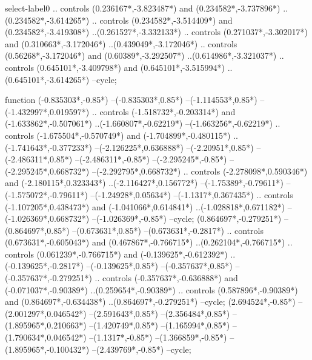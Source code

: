{\begin{scope}[x=1mm,y=1mm,line width=\SCstroke mm,line cap=round,line join=round]
\begin{SCpart}{select-label0}
.. controls ({0.236167*\SCF},{-3.823487*\SCF}) and ({0.234582*\SCF},{-3.737896*\SCF}) ..({0.234582*\SCF},{-3.614265*\SCF})
.. controls ({0.234582*\SCF},{-3.514409*\SCF}) and ({0.234582*\SCF},{-3.419308*\SCF}) ..({0.261527*\SCF},{-3.332133*\SCF})
.. controls ({0.271037*\SCF},{-3.302017*\SCF}) and ({0.310663*\SCF},{-3.172046*\SCF}) ..({0.439049*\SCF},{-3.172046*\SCF})
.. controls ({0.56268*\SCF},{-3.172046*\SCF}) and ({0.60389*\SCF},{-3.292507*\SCF}) ..({0.614986*\SCF},{-3.321037*\SCF})
.. controls ({0.645101*\SCF},{-3.409798*\SCF}) and ({0.645101*\SCF},{-3.515994*\SCF}) ..({0.645101*\SCF},{-3.614265*\SCF})
--cycle;
\end{SCpart}
\begin{SCpart}{function}
 ({-0.835303*\SCF},{-0.85*\SCF})
--({-0.835303*\SCF},{0.85*\SCF})
--({-1.114553*\SCF},{0.85*\SCF})
--({-1.432997*\SCF},{0.019597*\SCF})
.. controls ({-1.518732*\SCF},{-0.203314*\SCF}) and ({-1.633862*\SCF},{-0.507061*\SCF}) ..({-1.660807*\SCF},{-0.62219*\SCF})
--({-1.663256*\SCF},{-0.62219*\SCF})
.. controls ({-1.675504*\SCF},{-0.570749*\SCF}) and ({-1.704899*\SCF},{-0.480115*\SCF}) ..({-1.741643*\SCF},{-0.377233*\SCF})
--({-2.126225*\SCF},{0.636888*\SCF})
--({-2.20951*\SCF},{0.85*\SCF})
--({-2.486311*\SCF},{0.85*\SCF})
--({-2.486311*\SCF},{-0.85*\SCF})
--({-2.295245*\SCF},{-0.85*\SCF})
--({-2.295245*\SCF},{0.668732*\SCF})
--({-2.292795*\SCF},{0.668732*\SCF})
.. controls ({-2.278098*\SCF},{0.590346*\SCF}) and ({-2.180115*\SCF},{0.323343*\SCF}) ..({-2.116427*\SCF},{0.156772*\SCF})
--({-1.75389*\SCF},{-0.79611*\SCF})
--({-1.575072*\SCF},{-0.79611*\SCF})
--({-1.24928*\SCF},{0.05634*\SCF})
--({-1.1317*\SCF},{0.367435*\SCF})
.. controls ({-1.107205*\SCF},{0.438473*\SCF}) and ({-1.041066*\SCF},{0.614841*\SCF}) ..({-1.028818*\SCF},{0.671182*\SCF})
--({-1.026369*\SCF},{0.668732*\SCF})
--({-1.026369*\SCF},{-0.85*\SCF})
--cycle;
 ({0.864697*\SCF},{-0.279251*\SCF})
--({0.864697*\SCF},{0.85*\SCF})
--({0.673631*\SCF},{0.85*\SCF})
--({0.673631*\SCF},{-0.2817*\SCF})
.. controls ({0.673631*\SCF},{-0.605043*\SCF}) and ({0.467867*\SCF},{-0.766715*\SCF}) ..({0.262104*\SCF},{-0.766715*\SCF})
.. controls ({0.061239*\SCF},{-0.766715*\SCF}) and ({-0.139625*\SCF},{-0.612392*\SCF}) ..({-0.139625*\SCF},{-0.2817*\SCF})
--({-0.139625*\SCF},{0.85*\SCF})
--({-0.357637*\SCF},{0.85*\SCF})
--({-0.357637*\SCF},{-0.279251*\SCF})
.. controls ({-0.357637*\SCF},{-0.636888*\SCF}) and ({-0.071037*\SCF},{-0.90389*\SCF}) ..({0.259654*\SCF},{-0.90389*\SCF})
.. controls ({0.587896*\SCF},{-0.90389*\SCF}) and ({0.864697*\SCF},{-0.634438*\SCF}) ..({0.864697*\SCF},{-0.279251*\SCF})
--cycle;
 ({2.694524*\SCF},{-0.85*\SCF})
--({2.001297*\SCF},{0.046542*\SCF})
--({2.591643*\SCF},{0.85*\SCF})
--({2.356484*\SCF},{0.85*\SCF})
--({1.895965*\SCF},{0.210663*\SCF})
--({1.420749*\SCF},{0.85*\SCF})
--({1.165994*\SCF},{0.85*\SCF})
--({1.790634*\SCF},{0.046542*\SCF})
--({1.1317*\SCF},{-0.85*\SCF})
--({1.366859*\SCF},{-0.85*\SCF})
--({1.895965*\SCF},{-0.100432*\SCF})
--({2.439769*\SCF},{-0.85*\SCF})
--cycle;
\end{SCpart}
\end{scope}
}
